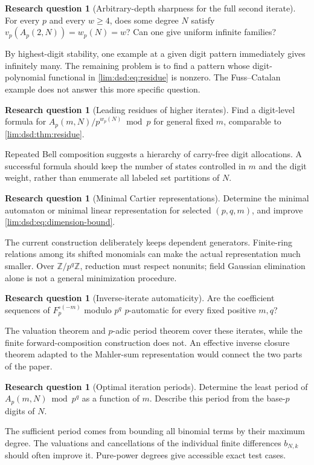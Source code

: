 \documentclass[11pt]{article}
\theoremstyle{definition}
\newtheorem{question}[theorem]{Research question}
\theoremstyle{remark}
\newcommand{\Z}{\mathbb Z}
\begin{document}
\begin{question}[Arbitrary-depth sharpness for the full second iterate]
\label{lim:dsd:q:sharpness}
For every $p$ and every $w\ge4$, does some degree $N$ satisfy
$v_p(A_p(2,N))=w_p(N)=w$? Can one give uniform infinite families?
\end{question}
By highest-digit stability, one example at a given digit pattern
immediately gives infinitely many. The remaining problem is to
find a pattern whose digit-polynomial functional in
\eqref{lim:dsd:eq:residue} is nonzero. The Fuss--Catalan example does not
answer this more specific question.

\begin{question}[Leading residues of higher iterates]
\label{lim:dsd:q:higher-residues}
Find a digit-level formula for $A_p(m,N)/p^{w_p(N)}\bmod p$
for general fixed $m$, comparable to \cref{lim:dsd:thm:residue}.
\end{question}
Repeated Bell composition suggests a hierarchy of carry-free
digit allocations. A successful formula should keep the number
of states controlled in $m$ and the digit weight, rather than
enumerate all labeled set partitions of $N$.

\begin{question}[Minimal Cartier representations]
\label{lim:dsd:q:cartier-min}
Determine the minimal automaton or minimal linear representation
for selected $(p,q,m)$, and improve \eqref{lim:dsd:eq:dimension-bound}.
\end{question}
The current construction deliberately keeps dependent generators.
Finite-ring relations among its shifted monomials can make the
actual representation much smaller. Over $\Z/p^q\Z$, reduction
must respect nonunits; field Gaussian elimination alone is not
a general minimization procedure.

\begin{question}[Inverse-iterate automaticity]
\label{lim:dsd:q:inverse-auto}
Are the coefficient sequences of $F_p^{\circ(-m)}$ modulo $p^q$
$p$-automatic for every fixed positive $m,q$?
\end{question}
The valuation theorem and $p$-adic period theorem cover these
iterates, while the finite forward-composition construction does
not. An effective inverse closure theorem adapted to the
Mahler-sum representation would connect the two parts of the paper.

\begin{question}[Optimal iteration periods]
\label{lim:dsd:q:periods}
Determine the least period of $A_p(m,N)\bmod p^q$ as a function of $m$.
Describe this period from the base-$p$ digits of $N$.
\end{question}
The sufficient period comes from bounding all binomial terms by
their maximum degree. The valuations and cancellations of the
individual finite differences $b_{N,k}$ should often improve it.
Pure-power degrees give accessible exact test cases.
\end{document}
